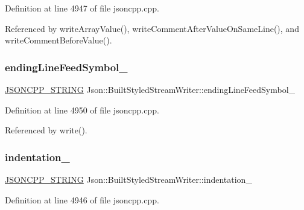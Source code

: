 Definition at line 4947 of file jsoncpp.\+cpp.



Referenced by write\+Array\+Value(), write\+Comment\+After\+Value\+On\+Same\+Line(), and write\+Comment\+Before\+Value().

\mbox{\label{struct_json_1_1_built_styled_stream_writer_a5e61a9a4b2af52b98900286c843b86f7}} 
\subsubsection{\texorpdfstring{ending\+Line\+Feed\+Symbol\+\_\+}{endingLineFeedSymbol\_}}
{\footnotesize\ttfamily \hyperlink{json_8h_a1e723f95759de062585bc4a8fd3fa4be}{J\+S\+O\+N\+C\+P\+P\+\_\+\+S\+T\+R\+I\+NG} Json\+::\+Built\+Styled\+Stream\+Writer\+::ending\+Line\+Feed\+Symbol\+\_\+\hspace{0.3cm}{\ttfamily [private]}}



Definition at line 4950 of file jsoncpp.\+cpp.



Referenced by write().

\mbox{\label{struct_json_1_1_built_styled_stream_writer_aaa4cbad91428ceca37cbabfc2a17a92d}} 
\subsubsection{\texorpdfstring{indentation\+\_\+}{indentation\_}}
{\footnotesize\ttfamily \hyperlink{json_8h_a1e723f95759de062585bc4a8fd3fa4be}{J\+S\+O\+N\+C\+P\+P\+\_\+\+S\+T\+R\+I\+NG} Json\+::\+Built\+Styled\+Stream\+Writer\+::indentation\+\_\+\hspace{0.3cm}{\ttfamily [private]}}



Definition at line 4946 of file jsoncpp.\+cpp.



